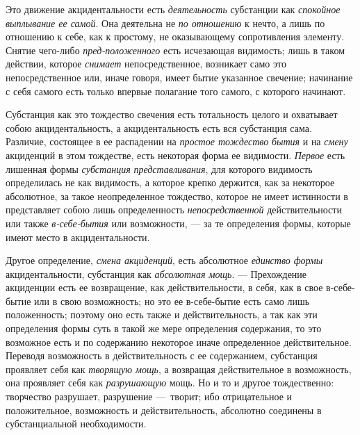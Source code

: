 Это движение акцидентальности есть {\em деятельность}
субстанции как {\em спокойное выплывание ее самой}. Она
деятельна не {\em по отношению} к нечто, а лишь по
отношению к себе, как к простому, не оказывающему сопротивления элементу.
Снятие чего-либо {\em пред-положенного} есть исчезающая
видимость; лишь в таком действии, которое {\em снимает}
непосредственное, возникает само это непосредственное или, иначе говоря,
имеет бытие указанное свечение; начинание с себя самого есть только впервые
полагание того самого, с которого начинают.

Субстанция как это тождество свечения есть тотальность целого и охватывает
собою акцидентальность, а акцидентальность есть вся субстанция сама.
Различие, состоящее в ее распадении на {\em простое
тождество} {\em бытия} и на
{\em смену} акциденций в этом тождестве, есть некоторая
форма ее видимости. {\em Первое} есть лишенная формы
{\em субстанция}
{\em представливания}, для которого видимость
определилась не как видимость, а которое крепко держится, как за некоторое
абсолютное, за такое неопределенное тождество, которое не имеет истинности
в представляет собою лишь определенность
{\em непосредственной} действительности или также
{\em в-себе-бытия} или возможности, — за те определения
формы, которые имеют место в акцидентальности.

Другое определение, {\em смена акциденций}, есть
абсолютное {\em единство формы} акцидентальности,
субстанция как {\em абсолютная мощь}. — Прехождение
акциденции есть ее возвращение, как действительности, в себя, как в свое
в-себе-бытие или в свою возможность; но это ее в-себе-бытие есть само лишь
положенность; поэтому оно есть также и действительность, а так как эти
определения формы суть в такой же мере определения содержания, то это
возможное есть и по содержанию некоторое иначе определенное действительное.
Переводя возможность в действительность с ее содержанием, субстанция
проявляет себя как {\em творящую мощь}, а возвращая
действительное в возможность, она проявляет себя как
{\em разрушающую} мощь. Но и то и другое тождественно:
творчество разрушает, разрушение —~творит; ибо отрицательное и
положительное, возможность и действительность, абсолютно соединены в
субстанциальной необходимости.

